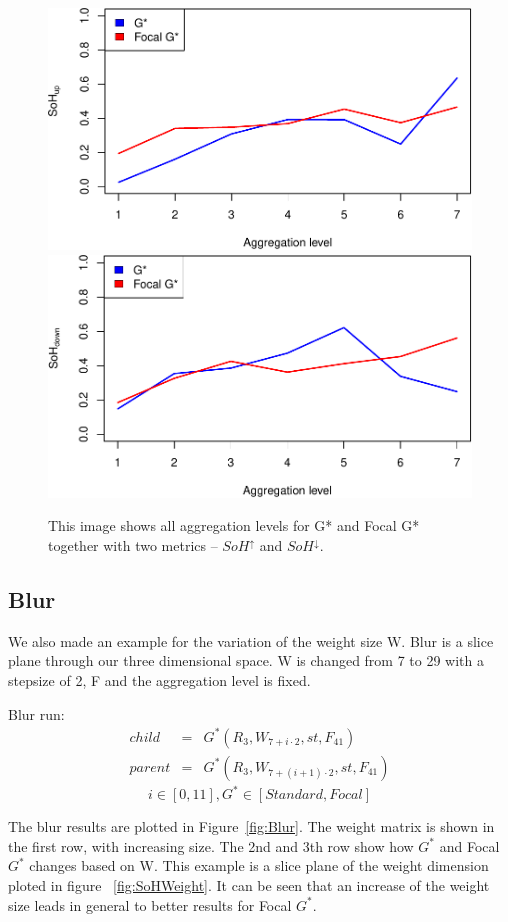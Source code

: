 \documentclass{itatnew}
\begin{document}
\begin{figure}[htp]
  \vspace{2em}
  \includegraphics[width=.45\linewidth]{images/gen-zoom-sohup-1}
  \hspace{1em}
  \includegraphics[width=.45\linewidth]{images/gen-zoom-sohdown-1}
  
  \caption{
    This image shows all aggregation levels for G* and Focal G* together 
    with two metrics -- $SoH^\uparrow$ and $SoH^\downarrow$.
  }
  \label{fig:Zoom}
\end{figure}

\subsection{Blur}
We also made an example for the variation of the weight size W.
Blur is a slice plane through our three dimensional space. 
W is changed from 7 to 29 with a stepsize of 2, F and the aggregation level is fixed.
\begin{definition} Blur run:
\begin{eqnarray*}
    child & = & G^*(R_3, W_{7+i \cdot 2}, st, F_{41}) \\
    parent & = & G^*(R_3, W_{7+(i+1)\cdot 2}, st, F_{41})
  \end{eqnarray*}
\begin{displaymath}
i \in [0,11], G^* \in [Standard, Focal]
\end{displaymath}
\end{definition}
The blur results are plotted in Figure~\ref{fig:Blur}. The weight matrix is
shown in the first row, with increasing size. The 2nd and 3th row show how
$G^*$ and Focal $G^*$ changes based on W. This example is a slice plane of the
weight dimension ploted in figure ~\ref{fig:SoHWeight}. It can be seen that an
increase of the weight size leads in general to better results for Focal $G^*$.
\end{document}
